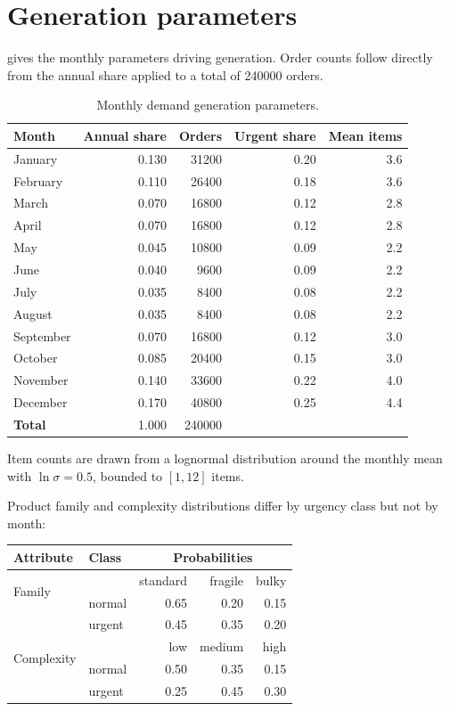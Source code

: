 \section{Generation parameters}

 gives the monthly parameters driving generation. Order counts follow
directly from the annual share applied to a total of \num{240000} orders.

\begin{table}[htbp]
\centering
\caption[Monthly generation parameters]{Monthly demand generation parameters.}
\label{tab:generation}
\small
\begin{tabular}{lrrrr}
\toprule
\textbf{Month} & \textbf{Annual share} & \textbf{Orders} & \textbf{Urgent share} &
\textbf{Mean items} \\
\midrule
January   & 0.130 & \num{31200} & 0.20 & 3.6 \\
February  & 0.110 & \num{26400} & 0.18 & 3.6 \\
March     & 0.070 & \num{16800} & 0.12 & 2.8 \\
April     & 0.070 & \num{16800} & 0.12 & 2.8 \\
May       & 0.045 & \num{10800} & 0.09 & 2.2 \\
June      & 0.040 & \num{9600}  & 0.09 & 2.2 \\
July      & 0.035 & \num{8400}  & 0.08 & 2.2 \\
August    & 0.035 & \num{8400}  & 0.08 & 2.2 \\
September & 0.070 & \num{16800} & 0.12 & 3.0 \\
October   & 0.085 & \num{20400} & 0.15 & 3.0 \\
November  & 0.140 & \num{33600} & 0.22 & 4.0 \\
December  & 0.170 & \num{40800} & 0.25 & 4.4 \\
\midrule
\textbf{Total} & 1.000 & \num{240000} & & \\
\bottomrule
\end{tabular}
\end{table}

Item counts are drawn from a lognormal distribution around the monthly mean with
\(\ln\sigma = 0.5\), bounded to \([1, 12]\) items.

Product family and complexity distributions differ by urgency class but not by month:

\begin{center}
\small
\begin{tabular}{llrrr}
\toprule
\textbf{Attribute} & \textbf{Class} & \multicolumn{3}{c}{\textbf{Probabilities}} \\
\midrule
\multirow{2}{*}{Family} & & standard & fragile & bulky \\
 & normal & 0.65 & 0.20 & 0.15 \\
 & urgent & 0.45 & 0.35 & 0.20 \\
\midrule
\multirow{2}{*}{Complexity} & & low & medium & high \\
 & normal & 0.50 & 0.35 & 0.15 \\
 & urgent & 0.25 & 0.45 & 0.30 \\
\bottomrule
\end{tabular}
\end{center}

